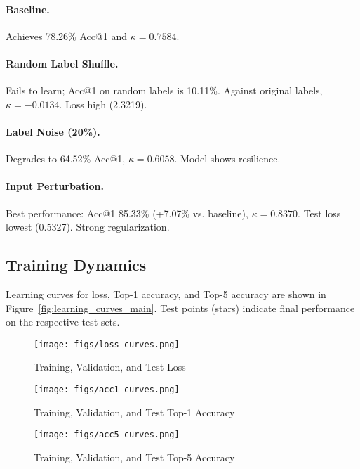 \documentclass[10pt,twocolumn,letterpaper]{article}
\begin{document}
\paragraph{Baseline.} Achieves 78.26\% Acc@1 and $\kappa=0.7584$.
\paragraph{Random Label Shuffle.} Fails to learn; Acc@1 on random labels is 10.11\%. Against original labels, $\kappa=-0.0134$. Loss high (2.3219).
\paragraph{Label Noise (20\%).} Degrades to 64.52\% Acc@1, $\kappa=0.6058$. Model shows resilience.
\paragraph{Input Perturbation.} Best performance: Acc@1 85.33\% (+7.07\% vs. baseline), $\kappa=0.8370$. Test loss lowest (0.5327). Strong regularization.

\subsection{Training Dynamics}
\label{ssec:training_dynamics}
Learning curves for loss, Top-1 accuracy, and Top-5 accuracy are shown in Figure~\ref{fig:learning_curves_main}. Test points (stars) indicate final performance on the respective test sets.

\begin{figure*}[htbp!] %
    \centering
    \begin{subfigure}{\textwidth}
        \centering
        \texttt{[image: figs/loss\_curves.png]}
        \caption{Training, Validation, and Test Loss}
        \label{fig:loss_curves_sub_main}
    \end{subfigure}
    \vfill %
    \begin{subfigure}{0.49\textwidth}
        \texttt{[image: figs/acc1\_curves.png]}
        \caption{Training, Validation, and Test Top-1 Accuracy}
        \label{fig:acc1_curves_sub_main}
    \end{subfigure}
    \hfill
    \begin{subfigure}{0.49\textwidth}
        \texttt{[image: figs/acc5\_curves.png]}
        \caption{Training, Validation, and Test Top-5 Accuracy}
        \label{fig:acc5_curves_sub_main}
    \end{subfigure}
    \caption{Learning curves for all four experimental configurations, showing (a) Cross-Entropy Loss, (b) Top-1 Accuracy, and (c) Top-5 Accuracy for training (solid lines), validation (dashed lines), and final test points (stars) across 200 epochs.}
    \label{fig:learning_curves_main}
\end{figure*}
\end{document}
